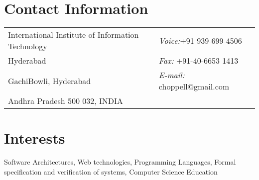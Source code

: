 \documentclass[11pt,margin,line]{res}
\begin{document}

\begin{resume}
\section{\sc Contact Information}
\vspace{.05in}
\begin{tabular}{@{}p{3.5in}p{3in}}
International Institute of Information  Technology  & {\it Voice:}+91 939-699-4506\\
Hyderabad                     &{\it Fax:}    +91-40-6653 1413\\
GachiBowli, Hyderabad        & {\it E-mail:}  choppell@gmail.com\\ 
Andhra Pradesh 500 032, INDIA            & %
\\     
\end{tabular}



\section{\sc Interests}
Software Architectures, Web technologies, Programming
Languages, Formal specification and verification of systems,
Computer Science Education


\end{resume}
\end{document}
